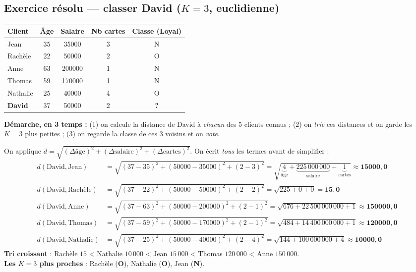 \subsection{Exercice résolu — classer David ($K=3$, euclidienne)}
\begin{center}\small
\begin{tabular}{lcccc}
\toprule
Client & Âge & Salaire & Nb cartes & Classe (Loyal)\\
\midrule
Jean & 35 & 35000 & 3 & N\\
Rachèle & 22 & 50000 & 2 & O\\
Anne & 63 & 200000 & 1 & N\\
Thomas & 59 & 170000 & 1 & N\\
Nathalie & 25 & 40000 & 4 & O\\
\rowcolor{orangeclair}\textbf{David} & 37 & 50000 & 2 & \textbf{?}\\
\bottomrule
\end{tabular}
\end{center}

\textbf{Démarche, en 3 temps :} (1) on calcule la distance de David à \emph{chacun} des 5
clients connus ; (2) on \emph{trie} ces distances et on garde les $K=3$ plus petites ;
(3) on regarde la classe de ces 3 voisins et on \emph{vote}.

\begin{Calcul}
On applique $d=\sqrt{(\Delta\text{âge})^2+(\Delta\text{salaire})^2+(\Delta\text{cartes})^2}$.
On écrit \emph{tous} les termes avant de simplifier :
\begin{align*}
d(\text{David},\text{Jean}) &=\sqrt{(37-35)^2+(50000-35000)^2+(2-3)^2}
   =\sqrt{\underbrace{4}_{\text{âge}}+\underbrace{225\,000\,000}_{\text{salaire}}+\underbrace{1}_{\text{cartes}}}\approx \mathbf{15000{,}0}\\
d(\text{David},\text{Rachèle}) &=\sqrt{(37-22)^2+(50000-50000)^2+(2-2)^2}
   =\sqrt{225+0+0}= \mathbf{15{,}0}\\
d(\text{David},\text{Anne}) &=\sqrt{(37-63)^2+(50000-200000)^2+(2-1)^2}
   =\sqrt{676+22\,500\,000\,000+1}\approx \mathbf{150000{,}0}\\
d(\text{David},\text{Thomas}) &=\sqrt{(37-59)^2+(50000-170000)^2+(2-1)^2}
   =\sqrt{484+14\,400\,000\,000+1}\approx \mathbf{120000{,}0}\\
d(\text{David},\text{Nathalie}) &=\sqrt{(37-25)^2+(50000-40000)^2+(2-4)^2}
   =\sqrt{144+100\,000\,000+4}\approx \mathbf{10000{,}0}
\end{align*}
\textbf{Tri croissant} : Rachèle $15$ < Nathalie $10\,000$ < Jean $15\,000$ < Thomas
$120\,000$ < Anne $150\,000$. \\
\textbf{Les $K=3$ plus proches} : Rachèle (\textbf{O}), Nathalie (\textbf{O}), Jean (\textbf{N}).
\end{Calcul}

